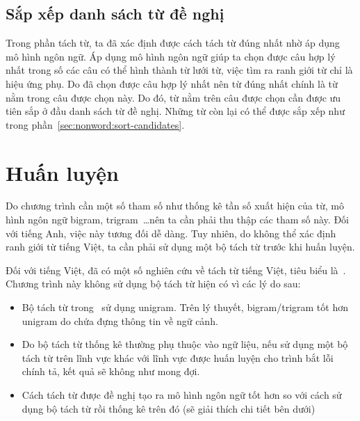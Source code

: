 \documentclass[a4paper,oneside,14pt]{extbook} %
\begin{document}




\subsection{Sắp xếp danh sách từ đề nghị}
\label{sec:realword:sort-candidates}

Trong phần tách từ, ta đã xác định được cách tách từ đúng nhất nhờ áp
dụng mô hình ngôn ngữ. Áp dụng mô hình ngôn ngữ giúp ta chọn được câu
hợp lý nhất trong số các câu có thể hình thành từ lưới từ, việc tìm ra
ranh giới từ chỉ là hiệu ứng phụ. Do đã chọn được câu hợp lý nhất nên
từ đúng nhất chính là từ nằm trong câu được chọn này. Do đó, từ nằm
trên câu được chọn cần được ưu tiên sắp ở đầu danh sách từ đề
nghị. Những từ còn lại có thể được sắp xếp như trong
phần~\ref{sec:nonword:sort-candidates}.

\section{Huấn luyện}
\label{sec:training}

Do chương trình cần một số tham số như thống kê tần số xuất hiện của
từ, mô hình ngôn ngữ bi\-gram, tri\-gram~\ldots nên ta cần phải thu thập
các tham số này. Đối với tiếng Anh, việc này tương đối dễ dàng. Tuy
nhiên, do không thể xác định ranh giới từ tiếng Việt, ta cần phải sử
dụng một bộ tách từ trước khi huấn luyện.

Đối với tiếng Việt, đã có một số nghiên cứu về tách từ tiếng Việt,
tiêu biểu là~\cite{Tachtu}. Chương trình này không sử dụng bộ tách từ
hiện có vì các lý do sau:
\begin{itemize}
\item Bộ tách từ trong~\cite{Tachtu} sử dụng uni\-gram. Trên lý thuyết,
  bi\-gram/tri\-gram tốt hơn uni\-gram do chứa đựng thông tin về ngữ cảnh.
\item Do bộ tách từ thống kê thường phụ thuộc vào ngữ liệu, nếu sử
  dụng một bộ tách từ trên lĩnh vực khác với lĩnh vực được huấn luyện
  cho trình bắt lỗi chính tả, kết quả sẽ không như mong đợi.
\item Cách tách từ được đề nghị tạo ra mô hình ngôn ngữ tốt hơn so với
  cách sử dụng bộ tách từ rồi thống kê trên đó (sẽ giải thích chi tiết
  bên dưới)
\end{itemize}
\end{document}
